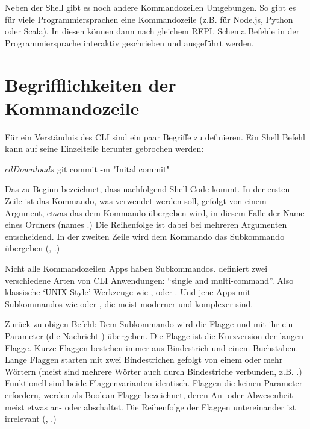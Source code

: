 \documentclass[oneside,bibliography=totocnumbered,BCOR=5mm]{scrbook}
\newenvironment{code}{\captionsetup{type=listing, skip=0pt}}{}
\begin{document}
Neben der Shell gibt es noch andere Kommandozeilen Umgebungen. So gibt es
für viele Programmiersprachen eine Kommandozeile (z.B. für Node.js, Python
oder Scala). In diesen können dann nach gleichem REPL Schema Befehle in der
Programmiersprache interaktiv geschrieben und ausgeführt werden.

\section{Begrifflichkeiten der Kommandozeile}

Für ein Verständnis des CLI sind ein paar Begriffe zu definieren. Ein Shell
Befehl kann auf seine Einzelteile herunter gebrochen werden:

\begin{code}
  \begin{shellcode}
$ cd Downloads
$ git commit -m "Inital commit"
  \end{shellcode}
\end{code}

Das \codeinline{\$} zu Beginn bezeichnet, dass nachfolgend Shell Code kommt. In
der ersten Zeile ist  das Kommando, was verwendet werden soll,
gefolgt von einem Argument, etwas das dem Kommando übergeben wird, in diesem
Falle der Name eines Ordners (names .) Die Reihenfolge
ist dabei bei mehreren Argumenten entscheidend. In der zweiten Zeile wird
dem  Kommando das Subkommando  übergeben
(\textcite{nagarajan2018}, \textcite{clig}.)

Nicht alle Kommandozeilen Apps haben Subkommandos. \textcite{12factor} definiert
zwei verschiedene Arten von CLI Anwendungen: ``single and multi-command''. Also
klassische `UNIX-Style' Werkzeuge wie ,  oder
. Und jene Apps mit Subkommandos wie  oder
, die meist moderner und komplexer sind.

Zurück zu obigen  Befehl: Dem  Subkommando
wird die  Flagge und mit ihr ein Parameter (die Nachricht
) übergeben. Die  Flagge ist die
Kurzversion der langen  Flagge. Kurze Flaggen bestehen
immer aus Bindestrich und einem Buchstaben. Lange Flaggen starten mit zwei
Bindestrichen gefolgt von einem oder mehr Wörtern (meist sind mehrere Wörter
auch durch Bindestriche verbunden, z.B. .)
Funktionell sind beide Flaggenvarianten identisch. Flaggen die keinen Parameter
erfordern, werden als Boolean Flagge bezeichnet, deren An- oder Abwesenheit
meist etwas an- oder abschaltet. Die Reihenfolge der Flaggen untereinander ist
irrelevant (\textcite{nagarajan2018}, \textcite{clig}.)
\end{document}
